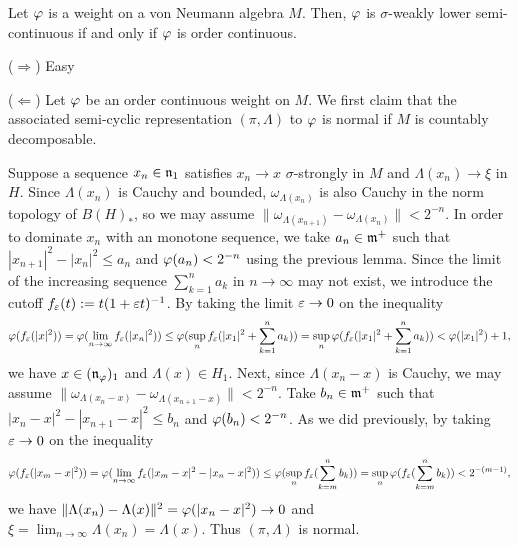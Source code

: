 \documentclass{../../../small}
\begin{document}
\begin{thm}
Let $\varphi$ is a weight on a von Neumann algebra $M$.
Then, $\varphi$ is $\sigma$-weakly lower semi-continuous if and only if $\varphi$ is order continuous.
\end{thm}
\begin{pf}
($\Rightarrow$)
Easy

($\Leftarrow$)
Let $\varphi$ be an order continuous weight on $M$.
We first claim that the associated semi-cyclic representation $(\pi,\Lambda)$ to $\varphi$ is normal if $M$ is countably decomposable.

Suppose a sequence $x_n\in\mathfrak{n}_1$ satisfies $x_n\to x$ $\sigma$-strongly in $M$ and $\Lambda(x_n)\to\xi$ in $H$.
Since $\Lambda(x_n)$ is Cauchy and bounded, $\omega_{\Lambda(x_n)}$ is also Cauchy in the norm topology of $B(H)_*$, so we may assume $\|\omega_{\Lambda(x_{n+1})}-\omega_{\Lambda(x_n)}\|<2^{-n}$.
In order to dominate $x_n$ with an monotone sequence, we take $a_n\in\mathfrak{m}^+$ such that $|x_{n+1}|^2-|x_n|^2\le a_n$ and $\varphi(a_n)<2^{-n}$ using the previous lemma.
Since the limit of the increasing sequence $\sum_{k=1}^n a_k$ in $n\to\infty$ may not exist, we introduce the cutoff $f_\varepsilon(t):=t(1+\varepsilon t)^{-1}$.
By taking the limit $\varepsilon\to0$ on the inequality
\[\varphi(f_\varepsilon(|x|^2))=\varphi(\lim_{n\to\infty}f_\varepsilon(|x_n|^2))\le\varphi(\sup_nf_\varepsilon(|x_1|^2+\sum_{k=1}^na_k))=\sup_n\varphi(f_\varepsilon(|x_1|^2+\sum_{k=1}^na_k))<\varphi(|x_1|^2)+1,\]
we have $x\in(\mathfrak{n}_\varphi)_1$ and $\Lambda(x)\in H_1$.
Next, since $\Lambda(x_n-x)$ is Cauchy, we may assume $\|\omega_{\Lambda(x_n-x)}-\omega_{\Lambda(x_{n+1}-x)}\|<2^{-n}$.
Take $b_n\in\mathfrak{m}^+$ such that $|x_n-x|^2-|x_{n+1}-x|^2\le b_n$ and $\varphi(b_n)<2^{-n}$.
As we did previously, by taking $\varepsilon\to0$ on the inequality
\[\varphi(f_\varepsilon(|x_m-x|^2))=\varphi(\lim_{n\to\infty}f_\varepsilon(|x_m-x|^2-|x_n-x|^2))\le\varphi(\sup_nf_\varepsilon(\sum_{k=m}^nb_k))=\sup_n\varphi(f_\varepsilon(\sum_{k=m}^nb_k))<2^{-(m-1)},\]
we have $\|\Lambda(x_n)-\Lambda(x)\|^2=\varphi(|x_n-x|^2)\to0$ and $\xi=\lim_{n\to\infty}\Lambda(x_n)=\Lambda(x)$.
Thus $(\pi,\Lambda)$ is normal.



\end{pf}
\end{document}
